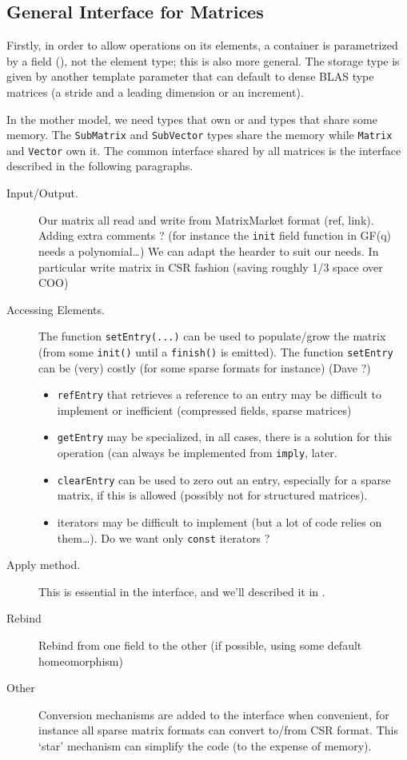 \subsection{General Interface for %
Matrices}
%
Firstly, in order to allow operations on its elements, a container is
parametrized by a field (\cf {}), not the element type; this is
also more general.  The storage type is given by another template parameter
that can default to \eg dense BLAS type matrices (a stride and a leading
dimension or an increment).
%

%
In the mother model, we need types that own or and types that share some
memory.  The \texttt{SubMatrix} and \texttt{SubVector} types share the memory
while \texttt{Matrix} and \texttt{Vector} own it.
%
The common interface shared by all matrices is the \applin  interface described
in the following paragraphs.
%
% 
%
\begin{description}
%
	\item[Input/Output.] Our matrix all read and write from MatrixMarket
		format (ref, link).  Adding extra comments ? (for instance the
		{\tt init} field function in GF(q) needs a polynomial\ldots) We
		can adapt the hearder to suit our needs. In particular write
		matrix in CSR fashion (saving roughly 1/3 space over COO)
%
	\item[Accessing Elements.] The function \texttt{setEntry(...)} can be
		used to populate/grow the matrix (from some \texttt{init()}
		until a \texttt{finish()} is emitted).  The function
		\texttt{setEntry} can be (very) costly (for some sparse formats
		for instance) (Dave ?)
%
		\begin{itemize}
			\item \texttt{refEntry} that retrieves a reference to
				an entry may be difficult to implement or
				inefficient (compressed fields, sparse
				matrices)
			\item \texttt{getEntry} may be specialized, in all
				cases, there is a solution for this operation
				(can always be implemented from \texttt{imply},
				\cf{} later.
			\item \texttt{clearEntry} can be used to zero out an
				entry, especially for a sparse matrix, if this
				is allowed (possibly not for structured
				matrices).
			\item iterators may be difficult to implement (but a
				lot of code relies on them\ldots). Do we want
				only {\tt const} iterators ?
%
		\end{itemize}
%
	\item[Apply method.]
		This is essential in the \applin interface, and we'll described
		it in .
%
	\item[Rebind] Rebind from one field to the other (if possible, using some default homeomorphism)
%
	\item[Other] Conversion mechanisms are added to the interface when
		convenient, for instance all sparse matrix formats can convert
		to/from CSR format. This `star' mechanism can simplify the code
		(to the expense of memory).
%
\end{description}
%
